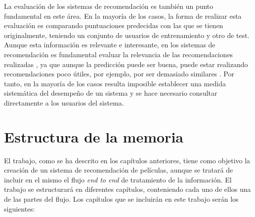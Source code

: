 La evaluación de los sistemas de recomendación es también un punto fundamental en este área. En la mayoría de los casos, la forma de realizar esta evaluación es comparando puntuaciones predecidas con las que se tienen originalmente, teniendo un conjunto de usuarios de entrenamiento y otro de test. Aunque esta información es relevante e interesante, en los sistemas de recomendación es fundamental evaluar la relevancia de las recomendaciones realizadas \cite{herlocker}, ya que aunque la predicción puede ser buena, puede estar realizando recomendaciones poco útiles, por ejemplo, por ser demasiado similares \cite{ziegler}. Por tanto, en la mayoría de los casos resulta imposible establecer una medida sistemática del desempeño de un sistema y se hace necesario consultar directamente a los usuarios del sistema.
\section{Estructura de la memoria}\label{sec:estructura}

El trabajo, como se ha descrito en los capítulos anteriores, tiene como objetivo la creación de un sistema de recomendación de películas, aunque se tratará de incluir en el mismo el flujo \textit{end to end} de tratamiento de la información. El trabajo se estructurará en diferentes capítulos, conteniendo cada uno de ellos una de las partes del flujo. Los capítulos que se incluirán en este trabajo serán los siguientes:

